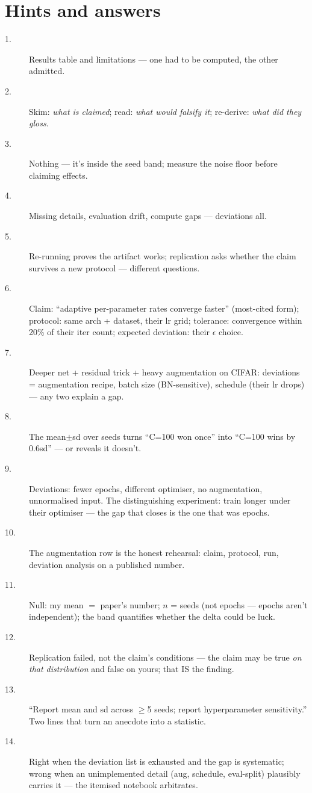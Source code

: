 \section*{Hints and answers}
\begin{description}
\item[1.] Results table and limitations --- one had to be computed,
the other admitted.
\item[2.] Skim: \emph{what is claimed}; read: \emph{what would
falsify it}; re-derive: \emph{what did they gloss}.
\item[3.] Nothing --- it's inside the seed band; measure the noise
floor before claiming effects.
\item[4.] Missing details, evaluation drift, compute gaps ---
deviations all.
\item[5.] Re-running proves the artifact works; replication asks
whether the claim survives a new protocol --- different questions.
\item[6.] Claim: ``adaptive per-parameter rates converge faster''
(most-cited form); protocol: same arch + dataset, their lr grid;
tolerance: convergence within 20\% of their iter count; expected
deviation: their $\epsilon$ choice.
\item[7.] Deeper net + residual trick + heavy augmentation on
CIFAR: deviations = augmentation recipe, batch size (BN-sensitive),
schedule (their lr drops) --- any two explain a gap.
\item[8.] The mean$\pm$sd over seeds turns ``C=100 won once'' into
``C=100 wins by 0.6sd'' --- or reveals it doesn't.
\item[9.] Deviations: fewer epochs, different optimiser, no
augmentation, unnormalised input. The distinguishing experiment:
train longer under their optimiser --- the gap that closes is the
one that was epochs.
\item[10.] The augmentation row is the honest rehearsal: claim,
protocol, run, deviation analysis on a published number.
\item[11.] Null: my mean $=$ paper's number; $n$ = seeds (not
epochs --- epochs aren't independent); the band quantifies whether
the delta could be luck.
\item[12.] Replication failed, not the claim's conditions --- the
claim may be true \emph{on that distribution} and false on yours;
that IS the finding.
\item[13.] ``Report mean and sd across $\ge$5 seeds; report
hyperparameter sensitivity.'' Two lines that turn an anecdote into
a statistic.
\item[14.] Right when the deviation list is exhausted and the gap
is systematic; wrong when an unimplemented detail (aug, schedule,
eval-split) plausibly carries it --- the itemised notebook
arbitrates.
\end{description}
